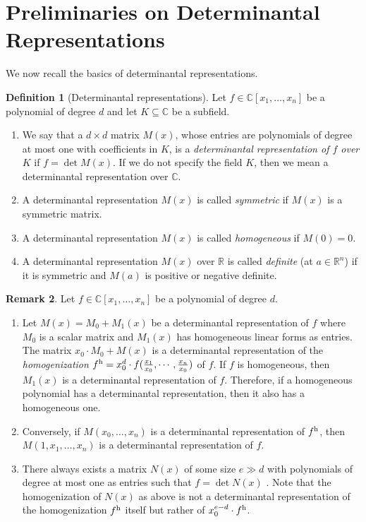 \documentclass[a4paper,10pt]{amsart}
\theoremstyle{definition}
\newtheorem{Def}{Definition}[section]
\newtheorem{rem}[Def]{Remark}
\theoremstyle{plain}
\newcommand{\C}{{\mathbb C}}
\newcommand{\R}{{\mathbb R}}
\begin{document}
\section{Preliminaries on Determinantal Representations} \label{sec:detprelim}
We now recall the basics of determinantal representations. 
\begin{Def}[Determinantal representations]\label{def:detrep}
    Let $f\in\C[x_1,\ldots,x_n]$ be a polynomial of degree $d$ and let $K\subseteq\C$ be a subfield. 
    \begin{enumerate}
        \item We say that a $d\times d$ matrix $M(x)$, whose entries are polynomials of degree at most one with coefficients in $K$, is a \emph{determinantal representation of $f$ over $K$} if $f=\det M(x)$. If we do not specify the field $K$, then we mean a determinantal representation over $\C$.
        \item A determinantal representation $M(x)$ is called \emph{symmetric} if $M(x)$ is a symmetric matrix.
        \item A determinantal representation $M(x)$ is called \emph{homogeneous} if $M(0)=0$.
        \item A determinantal representation $M(x)$ over $\R$ is called \emph{definite} (at $a\in\R^n$) if it is symmetric and $M(a)$ is positive or negative definite.
    \end{enumerate}
\end{Def}
\begin{rem}\label{rem:detrep}
Let $f\in\C[x_1,\ldots,x_n]$ be a polynomial of degree $d$.
\begin{enumerate}
    \item Let $M(x)=M_0+M_1(x)$ be a determinantal representation of $f$ where $M_0$ is a scalar matrix and $M_1(x)$ has homogeneous linear forms as entries. The matrix $x_0\cdot M_0+M(x)$ is a  determinantal representation of the \emph{homogenization} $f^{\rm h}=x_0^d\cdot f(\frac{x_1}{x_0},\cdots,\frac{x_n}{x_0})$ of $f$.  If $f$ is homogeneous, then $M_1(x)$ is a determinantal representation of $f$. Therefore, if a homogeneous polynomial has a determinantal representation, then it also has a homogeneous one.
    \item Conversely, if $M(x_0,\ldots,x_n)$ is a determinantal representation of $f^{\rm h}$, then $M(1,x_1,\ldots,x_n)$ is a determinantal representation of $f$.
    \item There always exists a matrix $N(x)$ of some size $e\gg d$ with polynomials of degree at most one as entries such that $f=\det N(x)$ \cite{valiant}. Note that the homogenization of $N(x)$ as above is not a determinantal representation of the homogenization $f^{\rm h}$ itself but rather of $x_0^{e-d}\cdot f^{\rm h}$. 
\end{enumerate}    
\end{rem}
\end{document}
